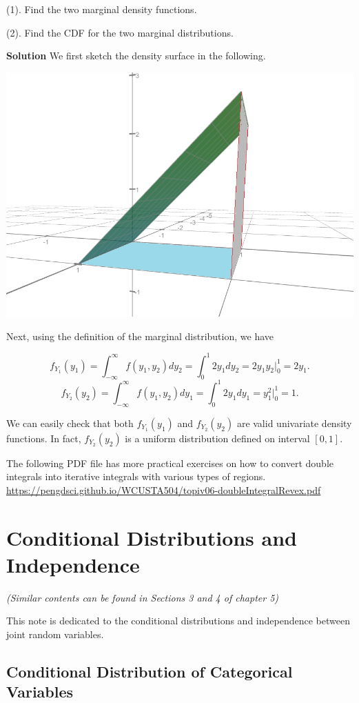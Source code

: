\documentclass[
]{book}
\begin{document}
(1). Find the two marginal density functions.

(2). Find the CDF for the two marginal distributions.

\textbf{Solution} We first sketch the density surface in the following.

\begin{center}\includegraphics[width=0.6\linewidth]{topic06/calcReviewExampl8Surface} \end{center}

Next, using the definition of the marginal distribution, we have

\[
f_{Y_1}(y_1) = \int_{-\infty}^\infty f(y_1, y_2) dy_2 = \int_0^1 2y_1dy_2 = 2y_1y_2\Big|_0^1 = 2y_1.
\]
\[
f_{Y_2}(y_2) = \int_{-\infty}^\infty f(y_1, y_2) dy_1 = \int_0^1 2y_1dy_1 = y_1^2\Big|_0^1 = 1.
\]

We can easily check that both \(f_{Y_1}(y_1)\) and \(f_{Y_2}(y_2)\) are valid univariate density functions. In fact, \(f_{Y_2}(y_2)\) is a uniform distribution defined on interval \([0, 1]\).

\hfill\break

The following PDF file has more practical exercises on how to convert double integrals into iterative integrals with various types of regions. \url{https://pengdsci.github.io/WCUSTA504/topiv06-doubleIntegralRevex.pdf}

\hypertarget{conditional-distributions-and-independence}{%
\chapter{Conditional Distributions and Independence}\label{conditional-distributions-and-independence}}

\emph{(Similar contents can be found in Sections 3 and 4 of chapter 5)}

This note is dedicated to the conditional distributions and independence between joint random variables.

\hypertarget{conditional-distribution-of-categorical-variables}{%
\section{Conditional Distribution of Categorical Variables}\label{conditional-distribution-of-categorical-variables}}
\end{document}
